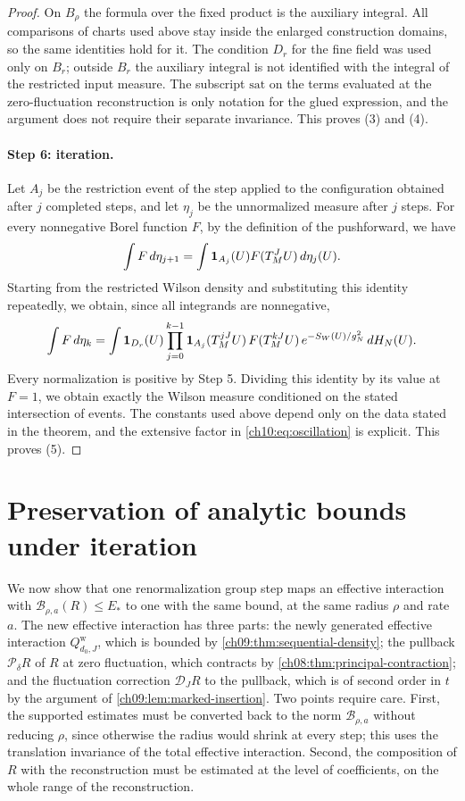 \begin{proof}
On $B_\rho$ the formula over the fixed product is the auxiliary integral. All comparisons of charts used above stay inside the enlarged construction domains, so the same identities hold for it. The condition $D_r$ for the fine field was used only on $B_r$; outside $B_r$ the auxiliary integral is not identified with the integral of the restricted input measure. The subscript $\mathrm{sat}$ on the terms evaluated at the zero-fluctuation reconstruction is only notation for the glued expression, and the argument does not require their separate invariance. This proves (3) and (4).

\paragraph{Step 6: iteration.}
Let $A_j$ be the restriction event of the step applied to the configuration obtained after $j$ completed steps, and let $\eta_j$ be the unnormalized measure after $j$ steps. For every nonnegative Borel function $F$, by the definition of the pushforward, we have
\[
 \int F\,d\eta_{j+1}=\int\mathbf 1_{A_j}(U)F(T_M^JU)\,d\eta_j(U).
\]
Starting from the restricted Wilson density and substituting this identity repeatedly, we obtain, since all integrands are nonnegative,
\[
 \int F\,d\eta_k=\int\mathbf 1_{D_r}(U)\prod_{j=0}^{k-1}\mathbf 1_{A_j}(T_M^{jJ}U)\,F(T_M^{kJ}U)\,e^{-S_W(U)/g_N^2}\,dH_N(U).
\]
Every normalization is positive by Step 5. Dividing this identity by its value at $F=1$, we obtain exactly the Wilson measure conditioned on the stated intersection of events.  The constants used above depend only on the data stated in the theorem, and the extensive factor in \eqref{ch10:eq:oscillation} is explicit. This proves (5).
\end{proof}

\section{Preservation of analytic bounds under iteration}\label{ch10:sec:iteration}

We now show that one renormalization group step maps an effective interaction with $\mathcal B_{\rho,a}(R)\le E_*$ to one with the same bound, at the same radius $\rho$ and rate $a$. The new effective interaction has three parts: the newly generated effective interaction $Q_{d_0,J}^{\mathrm w}$, which is bounded by \cref{ch09:thm:sequential-density}; the pullback $\mathcal P_\delta R$ of $R$ at zero fluctuation, which contracts by \cref{ch08:thm:principal-contraction}; and the fluctuation correction $\mathcal D_JR$ to the pullback, which is of second order in $t$ by the argument of \cref{ch09:lem:marked-insertion}. Two points require care. First, the supported estimates must be converted back to the norm $\mathcal B_{\rho,a}$ without reducing $\rho$, since otherwise the radius would shrink at every step; this uses the translation invariance of the total effective interaction. Second, the composition of $R$ with the reconstruction must be estimated at the level of coefficients, on the whole range of the reconstruction.

